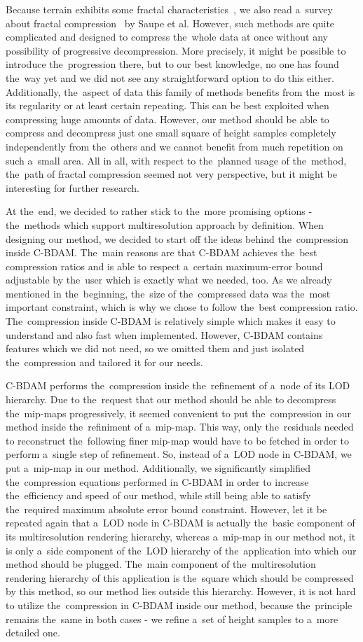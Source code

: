 Because terrain exhibits some fractal characteristics~\cite{fractalChar}, we also read a~survey about fractal compression~\cite{fractal} by Saupe et al. However, such methods are quite complicated and designed to compress the~whole data at once without any possibility of progressive decompression. More precisely, it might be possible to introduce the~progression there, but to our best knowledge, no one has found the~way yet and we did not see any straightforward option to do this either. Additionally, the~aspect of data this family of methods benefits from the~most is its regularity or at least certain repeating. This can be best exploited when compressing huge amounts of data. However, our method should be able to compress and decompress just one small square of height samples completely independently from the~others and we cannot benefit from much repetition on such a~small area. All in all, with respect to the~planned usage of the~method, the~path of fractal compression seemed not very perspective, but it might be interesting for further research. 
 
 At the~end, we decided to rather stick to the~more promising options - the~methods which support multiresolution approach by definition. When designing our method, we decided to start off the ideas behind the~compression inside C-BDAM. The~main reasons are that C-BDAM achieves the~best compression ratios and is able to respect a~certain maximum-error bound adjustable by the~user which is exactly what we needed, too. As we already mentioned in the~beginning, the~size of the~compressed data was the~most important constraint, which is why we chose to follow the~best compression ratio. The~compression inside C-BDAM is relatively simple which makes it easy to understand and also fast when implemented. However, C-BDAM contains features which we did not need, so we omitted them and just isolated the~compression and tailored it for our needs. 
 
 C-BDAM performs the~compression inside the~refinement of a~node of its LOD hierarchy. Due to the~request that our method should be able to decompress the~mip-maps progressively, it seemed convenient to put the~compression in our method inside the~refiniment of a~mip-map. This way, only the~residuals needed to reconstruct the~following finer mip-map would have to be fetched in order to perform a~single step of refinement. So, instead of a~LOD node in C-BDAM, we put a~mip-map in our method.  Additionally, we significantly simplified the~compression equations performed in C-BDAM in order to increase the~efficiency and speed of our method, while still being able to satisfy the~required maximum absolute error bound constraint. However, let it be repeated again that a~LOD node in C-BDAM is actually the~basic component of its multiresolution rendering hierarchy, whereas a~mip-map in our method not, it is only a~side component of the~LOD hierarchy of the~application into which our method should be plugged. The~main component of the~multiresolution rendering hierarchy of this application is the~square which should be compressed by this method, so our method lies outside this hierarchy. However, it is not hard to utilize the~compression in C-BDAM inside our method, because the~principle remains the~same in both cases - we refine a~set of height samples to a~more detailed one.
